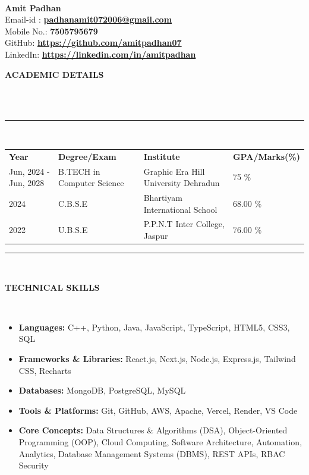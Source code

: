 \documentclass[a4paper,10pt]{article}
\newcommand{\isep}{-2 pt}
\newcommand{\lsep}{-0.5cm}
\newcommand{\resheading}[1]{{\small \colorbox{mygrey}{\begin{minipage}{0.975\textwidth}{\textbf{#1 \vphantom{p\^{E}}}}\end{minipage}}}}
\begin{document}
\hspace{0.5cm}\\[-0.2cm]

\textbf{Amit Padhan} \\
\indent Email-id : \textbf{\url{padhanamit072006@gmail.com}} \\
\indent Mobile No.: \textbf{7505795679} \\
\indent GitHub: \textbf{\url{https://github.com/amitpadhan07}} \\
\indent LinkedIn: \textbf{\url{https://linkedin.com/in/amitpadhan}} \\

\resheading{\textbf{ACADEMIC DETAILS} }\\[\lsep]
\\
\indent \rule{6.8in}{0.4pt}\\
\indent \begin{tabular}{ l @{\hskip 0.15in} l @{\hskip 0.15in} l @{\hskip 0.15in} l @{\hskip 0.15in} }
\noindent \textbf{Year} & \textbf{Degree/Exam} & \textbf{Institute} & \textbf{GPA/Marks(\%)}\\
Jun, 2024 - Jun, 2028 & B.TECH in Computer Science & Graphic Era Hill University Dehradun & 75 \% \\
2024 & C.B.S.E & Bhartiyam International School & 68.00 \% \\
2022 & U.B.S.E & P.P.N.T Inter College, Jaspur & 76.00 \%\\
\end{tabular}
\indent \rule{6.8in}{0.4pt}
\\

\resheading{\textbf{TECHNICAL SKILLS} }\\[\lsep]
\begin{itemize}
\setlength\itemsep{\isep}
\item \textbf{Languages:} C++, Python, Java, JavaScript, TypeScript, HTML5, CSS3, SQL
\item \textbf{Frameworks \& Libraries:} React.js, Next.js, Node.js, Express.js, Tailwind CSS, Recharts
\item \textbf{Databases:} MongoDB, PostgreSQL, MySQL
\item \textbf{Tools \& Platforms:} Git, GitHub, AWS, Apache, Vercel, Render, VS Code
\item \textbf{Core Concepts:} Data Structures \& Algorithms (DSA), Object-Oriented Programming (OOP), Cloud Computing, Software Architecture, Automation, Analytics, Database Management Systems (DBMS), REST APIs, RBAC Security
\end{itemize}
\end{document}
